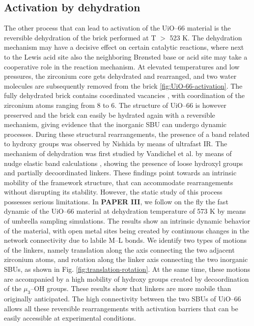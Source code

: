 \subsection*{Activation by dehydration}
The other process that can lead to activation of the UiO--66 material is the reversible dehydration of the brick performed at T $>$ 523 K. The dehydration mechanism may have a decisive effect on certain catalytic reactions, where next to the Lewis acid site also the neighboring Br\o{}nsted base or acid site may take a cooperative role in the reaction mechanism. At elevated temperatures and low pressures, the zirconium core gets dehydrated and rearranged, and two water molecules are subsequently removed from the brick \ref{fig:UiO-66-activation}. The fully dehydrated  brick contains coordinated vacancies \cite{valenzano2011disclosing, decoste2013stability, shearer2013situ, vandichel2015active}, with coordination of the zirconium atoms ranging from 8 to 6. The structure of UiO--66 is however preserved and the brick can easily be hydrated again with a reversible mechanism, giving evidence that the inorganic SBU can undergo dynamic processes. During these structural rearrangements, the presence of a band related to hydroxy groups was observed by Nishida by means of ultrafast IR\cite{nishida2014structural}. The mechanism of dehydration was first studied by Vandichel et al. by means of nudge elastic band calculations \cite{vandichel2016water}, showing the presence of loose hydroxyl groups and partially decoordinated linkers. These findings point towards an intrinsic mobility of the framework structure, that can accommodate rearrangements without disrupting its stability. However, the static study of this process possesses serious limitations. 
\npar
In \textbf{PAPER III}, we follow on the fly the fast dynamic of the UiO--66 material at dehydration temperature of 573 K by means of umbrella sampling simulations. The results show an intrinsic dynamic behavior of the material, with open metal sites being created by continuous changes in the network connectivity due to labile M--L bonds. We identify two types of motions of the linkers, namely translation along the axis connecting the two adjacent zirconium atoms, and rotation along the linker axis connecting the two inorganic SBUs, as shown in Fig. \ref{fig:translation-rotation}. At the same time, these motions are accompanied by a high mobility of hydroxy groups created by decoordination of the $\mu_3$--OH groups. These results show that linkers are more mobile than originally anticipated. The high connectivity between the two SBUs of UiO--66 allows all these reversible rearrangements with activation barriers that can be easily accessible at experimental conditions. 
